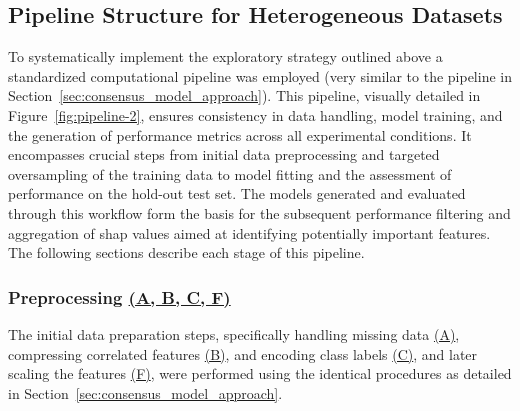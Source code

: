 \documentclass[12pt,a4paper]{report}
\begin{document}
\subsection{Pipeline Structure for Heterogeneous Datasets}
\label{subsec:pipeline_structure_for_Heterogeneous_datasets}
To systematically implement the exploratory strategy outlined above a standardized computational pipeline was employed (very similar to the pipeline in Section~\ref{sec:consensus_model_approach}). This pipeline, visually detailed in Figure~\ref{fig:pipeline-2}, ensures consistency in data handling, model training, and the generation of performance metrics across all experimental conditions. It encompasses crucial steps from initial data preprocessing and targeted oversampling of the training data to model fitting and the assessment of performance on the hold-out test set. The models generated and evaluated through this workflow form the basis for the subsequent performance filtering and aggregation of \gls{shap} values aimed at identifying potentially important features. The following sections describe each stage of this pipeline.

\subsubsection{Preprocessing \hyperref[fig:pipeline-2]{(A, B, C, F)}}
\noindent The initial data preparation steps, specifically handling missing data \hyperref[fig:pipeline-2]{(A)}, compressing correlated features \hyperref[fig:pipeline-2]{(B)}, and encoding class labels \hyperref[fig:pipeline-2]{(C)}, and later scaling the features \hyperref[fig:pipeline-2]{(F)}, were performed using the identical procedures as detailed in Section~\ref{sec:consensus_model_approach}.
\end{document}
